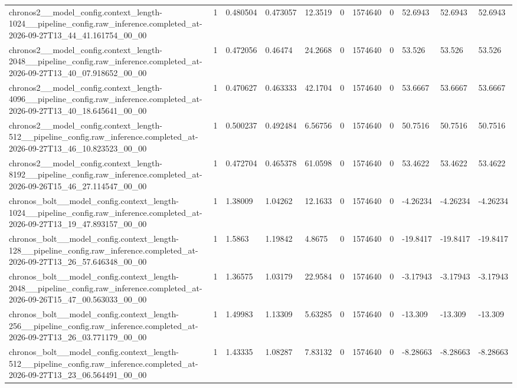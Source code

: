\begin{tabular}{lllllllllll}
chronos2\_\_model\_config.context\_length-1024\_\_pipeline\_config.raw\_inference.completed\_at-2026-09-27T13\_44\_41.161754\_00\_00 & 1 & 0.480504 & 0.473057 & 12.3519 & 0 & 1574640 & 0 & 52.6943 & 52.6943 & 52.6943 \\
chronos2\_\_model\_config.context\_length-2048\_\_pipeline\_config.raw\_inference.completed\_at-2026-09-27T13\_40\_07.918652\_00\_00 & 1 & 0.472056 & 0.46474 & 24.2668 & 0 & 1574640 & 0 & 53.526 & 53.526 & 53.526 \\
chronos2\_\_model\_config.context\_length-4096\_\_pipeline\_config.raw\_inference.completed\_at-2026-09-27T13\_40\_18.645641\_00\_00 & 1 & 0.470627 & 0.463333 & 42.1704 & 0 & 1574640 & 0 & 53.6667 & 53.6667 & 53.6667 \\
chronos2\_\_model\_config.context\_length-512\_\_pipeline\_config.raw\_inference.completed\_at-2026-09-27T13\_46\_10.823523\_00\_00 & 1 & 0.500237 & 0.492484 & 6.56756 & 0 & 1574640 & 0 & 50.7516 & 50.7516 & 50.7516 \\
chronos2\_\_model\_config.context\_length-8192\_\_pipeline\_config.raw\_inference.completed\_at-2026-09-26T15\_46\_27.114547\_00\_00 & 1 & 0.472704 & 0.465378 & 61.0598 & 0 & 1574640 & 0 & 53.4622 & 53.4622 & 53.4622 \\
chronos\_bolt\_\_model\_config.context\_length-1024\_\_pipeline\_config.raw\_inference.completed\_at-2026-09-27T13\_19\_47.893157\_00\_00 & 1 & 1.38009 & 1.04262 & 12.1633 & 0 & 1574640 & 0 & -4.26234 & -4.26234 & -4.26234 \\
chronos\_bolt\_\_model\_config.context\_length-128\_\_pipeline\_config.raw\_inference.completed\_at-2026-09-27T13\_26\_57.646348\_00\_00 & 1 & 1.5863 & 1.19842 & 4.8675 & 0 & 1574640 & 0 & -19.8417 & -19.8417 & -19.8417 \\
chronos\_bolt\_\_model\_config.context\_length-2048\_\_pipeline\_config.raw\_inference.completed\_at-2026-09-26T15\_47\_00.563033\_00\_00 & 1 & 1.36575 & 1.03179 & 22.9584 & 0 & 1574640 & 0 & -3.17943 & -3.17943 & -3.17943 \\
chronos\_bolt\_\_model\_config.context\_length-256\_\_pipeline\_config.raw\_inference.completed\_at-2026-09-27T13\_26\_03.771179\_00\_00 & 1 & 1.49983 & 1.13309 & 5.63285 & 0 & 1574640 & 0 & -13.309 & -13.309 & -13.309 \\
chronos\_bolt\_\_model\_config.context\_length-512\_\_pipeline\_config.raw\_inference.completed\_at-2026-09-27T13\_23\_06.564491\_00\_00 & 1 & 1.43335 & 1.08287 & 7.83132 & 0 & 1574640 & 0 & -8.28663 & -8.28663 & -8.28663 \\

\end{tabular}
